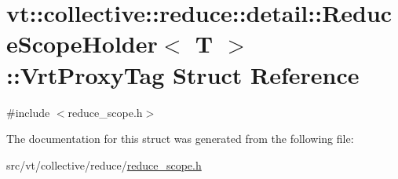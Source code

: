 \hypertarget{structvt_1_1collective_1_1reduce_1_1detail_1_1_reduce_scope_holder_1_1_vrt_proxy_tag}{}\section{vt\+:\+:collective\+:\+:reduce\+:\+:detail\+:\+:Reduce\+Scope\+Holder$<$ T $>$\+:\+:Vrt\+Proxy\+Tag Struct Reference}
\label{structvt_1_1collective_1_1reduce_1_1detail_1_1_reduce_scope_holder_1_1_vrt_proxy_tag}


{\ttfamily \#include $<$reduce\+\_\+scope.\+h$>$}



The documentation for this struct was generated from the following file\+:\begin{DoxyCompactItemize}
\item 
src/vt/collective/reduce/\hyperlink{reduce__scope_8h}{reduce\+\_\+scope.\+h}\end{DoxyCompactItemize}
